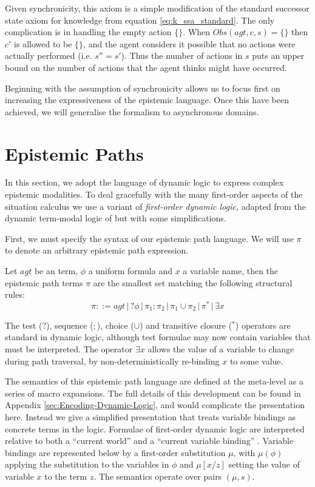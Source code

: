 Given synchronicity, this axiom is a simple modification of the standard
successor state axiom for knowledge from equation \eqref{eq:k_ssa_standard}.
The only complication is in handling the empty action $\{\}$. When
\textbf{$Obs(agt,c,s)=\{\}$} then $c'$ is allowed to be $\{\}$,
and the agent considers it possible that no actions were actually
performed (i.e. $s''=s'$). Thus the number of actions in $s$ puts
an upper bound on the number of actions that the agent thinks might
have occurred.

Beginning with the assumption of synchronicity allows us to focus
first on increasing the expressiveness of the epistemic language.
Once this have been achieved, we will generalise the formalism to
asynchronous domains.


\section{Epistemic Paths\label{sub:Epistemic-Paths}}

In this section, we adopt the language of dynamic logic to express
complex epistemic modalities. To deal gracefully with the many first-order
aspects of the situation calculus we use a variant of \emph{first-order
dynamic logic,} adapted from the dynamic term-modal logic of \citet{kooi07dyn_termmodal_logic}
but with some simplifications.

First, we must specify the syntax of our epistemic path language.
We will use $\pi$ to denote an arbitrary epistemic path expression.

\begin{defnL}
 Let $agt$ be an term, $\phi$ a uniform formula and $x$ a variable name, then the
epistemic path terms $\pi$ are the smallest set matching the following
structural rules:\[
\pi::=agt\,|\,?\phi\,|\,\pi_{1};\pi_{2}\,|\,\pi_{1}\cup\pi_{2}\,|\,\pi^{*}\,|\,\exists x\]

\end{defnL}
\smallskip{}


The test ($?$), sequence ($;$), choice ($\cup$) and transitive
closure ($^{*}$) operators are standard in dynamic logic, although
test formulae may now contain variables that must be interpreted.
The operator $\exists x$ allows the value of a variable to change
during path traversal, by non-deterministically re-binding $x$ to
some value.

The semantics of this epistemic path language are defined at the meta-level
as a series of macro expansions. The full details of this development
can be found in Appendix \ref{sec:Encoding-Dynamic-Logic}, and would
complicate the presentation here. Instead we give a simplified presentation
that treats variable bindings as concrete terms in the logic. Formulae
of first-order dynamic logic are interpreted relative to both a {}``current
world'' and a {}``current variable binding'' \citep{kooi07dyn_termmodal_logic}.
Variable bindings are represented below by a first-order substitution
$\mu$, with $\mu(\phi)$ applying the substitution to the variables
in $\phi$ and $\mu[x/z]$ setting the value of variable $x$ to the
term $z$. The semantics operate over pairs $(\mu,s)$.


